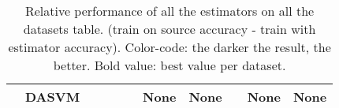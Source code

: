 \begin{table}[H]
\begin{tabular}{c|l|c|c|c|c|c|c|c|c|c|}
 & DASVM & \cellcolor{green!90}{+0.04} & \cellcolor{green!55}{+0.04} & \cellcolor{red!18}{-0.02} & \cellcolor{red!90}{-0.04} & None & None & \textbf{\cellcolor{green!90}{+0.17}} & None & None \\
\hline
\end{tabular}
\caption{Relative performance of all the estimators on all the datasets table. (train on source accuracy - train with estimator accuracy). Color-code: the darker the result, the better. Bold value: best value per dataset.}
\end{table}